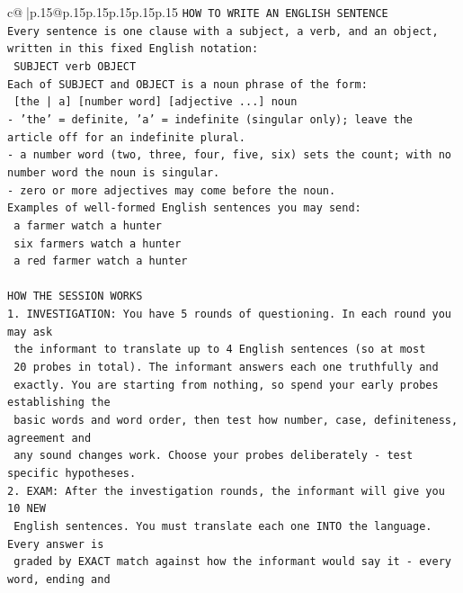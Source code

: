 \documentclass{article}
\begin{document}
{\begin{supertabular}{c@{$\;$}|p{.15\linewidth}@{}p{.15\linewidth}p{.15\linewidth}p{.15\linewidth}p{.15\linewidth}p{.15\linewidth}}
{{{\texttt{HOW TO WRITE AN ENGLISH SENTENCE} \\
\texttt{Every sentence is one clause with a subject, a verb, and an object, written in this fixed English notation:} \\
\texttt{    SUBJECT  verb  OBJECT} \\
\texttt{Each of SUBJECT and OBJECT is a noun phrase of the form:} \\
\texttt{    {[}the | a{]}  {[}number word{]}  {[}adjective ...{]}  noun} \\
\texttt{{-} 'the' = definite, 'a' = indefinite (singular only); leave the article off for an indefinite plural.} \\
\texttt{{-} a number word (two, three, four, five, six) sets the count; with no number word the noun is singular.} \\
\texttt{{-} zero or more adjectives may come before the noun.} \\
\texttt{Examples of well{-}formed English sentences you may send:} \\
\texttt{    a farmer watch a hunter} \\
\texttt{    six farmers watch a hunter} \\
\texttt{    a red farmer watch a hunter} \\
\\ 
\texttt{HOW THE SESSION WORKS} \\
\texttt{1. INVESTIGATION: You have 5 rounds of questioning. In each round you may ask} \\
\texttt{   the informant to translate up to 4 English sentences (so at most} \\
\texttt{   20 probes in total). The informant answers each one truthfully and} \\
\texttt{   exactly. You are starting from nothing, so spend your early probes establishing the} \\
\texttt{   basic words and word order, then test how number, case, definiteness, agreement and} \\
\texttt{   any sound changes work. Choose your probes deliberately {-} test specific hypotheses.} \\
\texttt{2. EXAM: After the investigation rounds, the informant will give you 10 NEW} \\
\texttt{   English sentences. You must translate each one INTO the language. Every answer is} \\
\texttt{   graded by EXACT match against how the informant would say it {-} every word, ending and} \\
}}}
\end{supertabular}}
\end{document}
